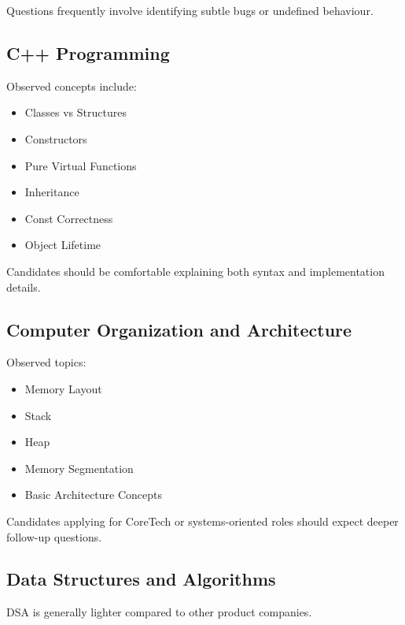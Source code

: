 \documentclass[11pt,a4paper]{article}
\begin{document}
Questions frequently involve identifying subtle bugs or undefined behaviour.


\subsection{C++ Programming}

Observed concepts include:

\begin{itemize}
	\item Classes vs Structures
	\item Constructors
	\item Pure Virtual Functions
	\item Inheritance
	\item Const Correctness
	\item Object Lifetime
\end{itemize}

Candidates should be comfortable explaining both syntax and implementation details.


\subsection{Computer Organization and Architecture}

Observed topics:

\begin{itemize}
	\item Memory Layout
	\item Stack
	\item Heap
	\item Memory Segmentation
	\item Basic Architecture Concepts
\end{itemize}

Candidates applying for CoreTech or systems-oriented roles should expect deeper follow-up questions.


\subsection{Data Structures and Algorithms}

DSA is generally lighter compared to other product companies.
\end{document}
